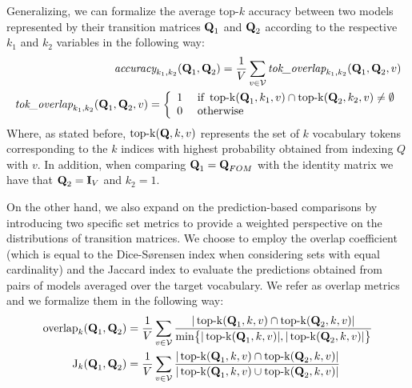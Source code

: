 Generalizing, we can formalize the average top-$k$ accuracy between two models represented by their transition matrices $\bm{\mathbf{Q}}_1$ and $\bm{\mathbf{Q}}_2$ according to the respective $k_1$ and $k_2$ variables in the following way:
\begin{equation}
    \label{eq:method_fom_topk}
    \begin{aligned}
    \textit{accuracy}_{k_1,k_2}(\bm{\mathbf{Q}}_1, \bm{\mathbf{Q}}_2) = \frac{1}{V} \sum_{v \in \mathcal{V}}{\textit{tok\_overlap}_{k_1,k_2}(\bm{\mathbf{Q}}_1, \bm{\mathbf{Q}}_2, v)} \\
    \textit{tok\_overlap}_{k_1,k_2}(\bm{\mathbf{Q}}_1, \bm{\mathbf{Q}}_2, v) = \left\{
        \begin{array}{cl}
            1 &\ \text{if}\ \operatorname{top-k}(\bm{\mathbf{Q}}_1, k_1, v) \cap \operatorname{top-k}(\bm{\mathbf{Q}}_2, k_2, v) \neq \emptyset \\
            0 &\ \text{otherwise}
        \end{array}
        \right.
    \end{aligned}
\end{equation}
Where, as stated before, $\operatorname{top-k}(\bm{\mathbf{Q}}, k, v)$ represents the set of $k$ vocabulary tokens corresponding to the $k$ indices with highest probability obtained from indexing $Q$ with $v$.
In addition, when comparing $\bm{\mathbf{Q}}_1 = \bm{\mathbf{Q}}_{FOM}$ with the identity matrix we have that $\bm{\mathbf{Q}}_2 = \bm{\mathbf{I}}_V$ and $k_2 = 1$.

On the other hand, we also expand on the prediction-based comparisons by introducing two specific set metrics to provide a weighted perspective on the distributions of transition matrices.
We choose to employ the overlap coefficient (which is equal to the Dice-S\o{}rensen index when considering sets with equal cardinality) and the Jaccard index to evaluate the predictions obtained from pairs of models averaged over the target vocabulary.
We refer  as overlap metrics and we formalize them in the following way:
\begin{equation}
    \label{eq:method_fom_overlap}
    \begin{aligned}
        \operatorname{overlap}_k(\gbm{Q}_1, \gbm{Q}_2) &= \frac{1}{V}\sum_{v \in \mathcal{V}}{\frac{|\operatorname{top-k}(\gbm{Q}_1, k, v) \cap \operatorname{top-k}(\gbm{Q}_2, k, v)|}{\operatornamewithlimits{min}\bigl\{|\operatorname{top-k}(\gbm{Q}_1, k, v)|, |\operatorname{top-k}(\gbm{Q}_2, k, v)|\bigr\}}} \\
        \operatorname{J}_k(\gbm{Q}_1, \gbm{Q}_2) &= \frac{1}{V}\sum_{v \in \mathcal{V}}{\frac{|\operatorname{top-k}(\gbm{Q}_1, k, v) \cap \operatorname{top-k}(\gbm{Q}_2, k, v)|}{|\operatorname{top-k}(\gbm{Q}_1, k, v) \cup \operatorname{top-k}(\gbm{Q}_2, k, v)|}} \\
    \end{aligned}
\end{equation}

